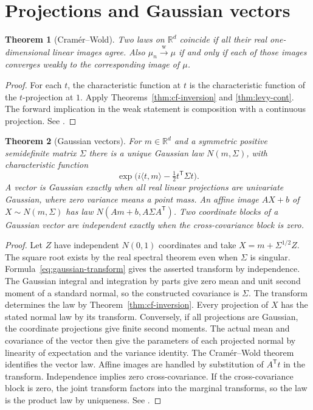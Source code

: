 \documentclass[11pt,oneside,openany]{book}
\newcommand{\R}{\mathbb{R}}
\newcommand{\weakto}{\xrightarrow{\mathrm{w}}}
\theoremstyle{plain}
\newtheorem{theorem}{Theorem}[chapter]
\theoremstyle{definition}
\theoremstyle{remark}
\begin{document}
\section{Projections and Gaussian vectors}
\label{p07-04}

\begin{theorem}[Cram\'er--Wold]\label{thm:cramer-wold}
Two laws on \(\R^d\) coincide if all their real one-dimensional linear
images agree. Also \(\mu_n\weakto\mu\) if and only if each of those images
converges weakly to the corresponding image of \(\mu\).
\end{theorem}
\begin{proof}
For each \(t\), the characteristic function at \(t\) is the characteristic
function of the \(t\)-projection at \(1\). Apply
Theorems~\ref{thm:cf-inversion} and \ref{thm:levy-cont}.
The forward implication in the weak statement is composition with
a continuous projection. See \cite[Corollary 6.5]{Kallenberg}.
\end{proof}

\begin{theorem}[Gaussian vectors]\label{thm:gaussian-vector}
For \(m\in\R^d\) and a symmetric positive semidefinite matrix \(\Sigma\)
there is a unique Gaussian law \(N(m,\Sigma)\), with characteristic
function
\[
 \exp\big(i\langle t,m\rangle-\tfrac12 t^\mathsf{T}\Sigma t\big).
\]
A vector is Gaussian exactly when all real linear projections are
univariate Gaussian, where zero variance means a point mass.
An affine image \(AX+b\) of \(X\sim N(m,\Sigma)\) has law
\(N(Am+b,A\Sigma A^\mathsf{T})\). Two coordinate blocks of a
Gaussian vector are independent exactly when the cross-covariance block
is zero.
\end{theorem}

\begin{proof}
Let \(Z\) have independent \(N(0,1)\) coordinates and take
\(X=m+\Sigma^{1/2}Z\). The square root exists by the real spectral theorem
even when \(\Sigma\) is singular. Formula~\eqref{eq:gaussian-transform}
gives the asserted transform by independence. The Gaussian integral
and integration by parts give zero mean and unit second moment of a
standard normal, so the constructed covariance is \(\Sigma\).
The transform determines the law by Theorem~\ref{thm:cf-inversion}.
Every projection of \(X\) has the stated normal law by its transform.
Conversely, if all projections are Gaussian, the coordinate projections
give finite second moments. The actual mean and covariance of the vector
then give the parameters of each projected normal by linearity of
expectation and the variance identity. The Cram\'er--Wold theorem
identifies the vector law. Affine images are handled by substitution
of \(A^\mathsf{T}t\) in the transform. Independence implies zero
cross-covariance. If the cross-covariance block is zero, the joint
transform factors into the marginal transforms, so the law is the
product law by uniqueness. See \cite[Section 3.10]{Durrett}.
\end{proof}
\end{document}

